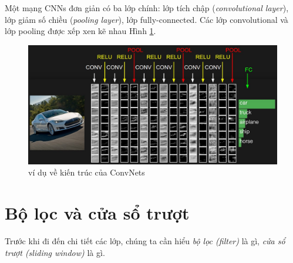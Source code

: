 Một mạng CNNs đơn giản có ba lớp chính: lớp tích chập (\textit{convolutional layer}), lớp giảm số chiều (\textit{pooling layer}), lớp fully-connected. Các lớp convolutional và lớp pooling được xếp xen kẽ nhau Hình \ref{fig:convNetArch}.
\begin{center}
\begin{figure}[H]
	\begin{center}
		\includegraphics[scale=0.2]{chap4/image/convnet.jpeg}
	\end{center}
	\caption{ví dụ về kiến trúc của ConvNets}
	
\label{fig:convNetArch}
\end{figure}
\end{center}
\section{Bộ lọc và cửa sổ trượt}
\hspace{5mm} Trước khi đi đến chi tiết các lớp, chúng ta cần hiểu \textit{bộ lọc (filter)} là gì, \textit{cửa sổ trượt (sliding window)} là gì.

